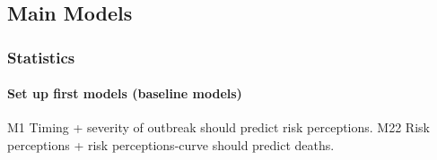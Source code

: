 \documentclass[
]{article}
\newenvironment{Shaded}{\begin{snugshade}}{\end{snugshade}}
\newcommand{\CommentTok}[1]{\textcolor[rgb]{0.56,0.35,0.01}{\textit{#1}}}
\newcommand{\DataTypeTok}[1]{\textcolor[rgb]{0.13,0.29,0.53}{#1}}
\newcommand{\DecValTok}[1]{\textcolor[rgb]{0.00,0.00,0.81}{#1}}
\newcommand{\KeywordTok}[1]{\textcolor[rgb]{0.13,0.29,0.53}{\textbf{#1}}}
\newcommand{\NormalTok}[1]{#1}
\newcommand{\OperatorTok}[1]{\textcolor[rgb]{0.81,0.36,0.00}{\textbf{#1}}}
\newcommand{\StringTok}[1]{\textcolor[rgb]{0.31,0.60,0.02}{#1}}
\begin{document}
\begin{Shaded}
\end{Shaded}

\hypertarget{main-models}{%
\subsection{Main Models}\label{main-models}}

\hypertarget{statistics}{%
\subsubsection{Statistics}\label{statistics}}

\hypertarget{set-up-first-models-baseline-models}{%
\paragraph{Set up first models (baseline
models)}\label{set-up-first-models-baseline-models}}

M1 Timing + severity of outbreak should predict risk perceptions. M22
Risk perceptions + risk perceptions-curve should predict deaths.
\end{document}
